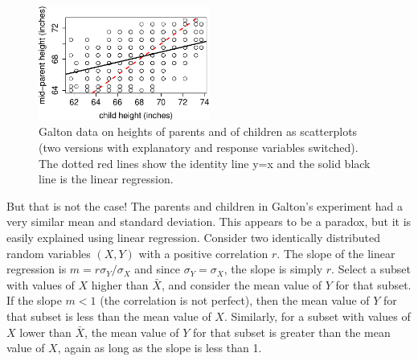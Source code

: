 \documentclass[
  letterpaper,
  DIV=11,
  numbers=noendperiod]{scrreprt}
\begin{document}
\begin{figure}[H]

{\centering \includegraphics[width=0.5\textwidth,height=\textheight]{./linreg_files/figure-pdf/linreg-Galton-2.pdf}

}

\caption{Galton data on heights of parents and of children as
scatterplots (two versions with explanatory and response variables
switched). The dotted red lines show the identity line y=x and the solid
black line is the linear regression.}

\end{figure}

But that is not the case! The parents and children in Galton's
experiment had a very similar mean and standard deviation. This appears
to be a paradox, but it is easily explained using linear regression.
Consider two identically distributed random variables \((X,Y)\) with a
positive correlation \(r\). The slope of the linear regression is
\(m = r \sigma_Y/\sigma_X\) and since \(\sigma_Y=\sigma_X\), the slope
is simply \(r\). Select a subset with values of \(X\) higher than
\(\bar X\), and consider the mean value of \(Y\) for that subset. If the
slope \(m<1\) (the correlation is not perfect), then the mean value of
\(Y\) for that subset is less than the mean value of \(X\). Similarly,
for a subset with values of \(X\) lower than \(\bar X\), the mean value
of \(Y\) for that subset is greater than the mean value of \(X\), again
as long as the slope is less than 1.
\end{document}
